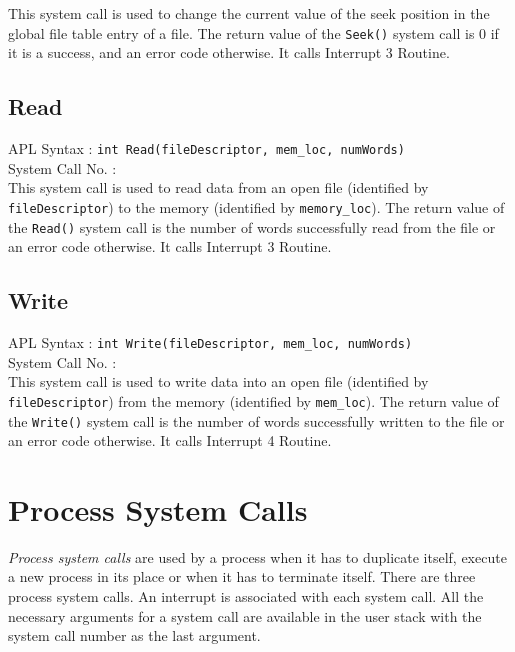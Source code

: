 \documentclass[10pt]{report}
\newcommand\counter[1]{\arabic{#1} \stepcounter{#1}}
\newcounter{syscall}
\begin{document}
This system call is used to change the current value of the seek position in the global file table entry of a file. The return value of the \texttt{Seek()} system call is 0 if it is a success, and an error code otherwise. It calls Interrupt 3 Routine. \\


\subsection{Read}
\label{sec:read()}

APL Syntax : \texttt{int Read(fileDescriptor, mem\_loc, numWords)}  \\
System Call No. : \counter{syscall} \\

This system call is used to read data from an open file (identified by \texttt{fileDescriptor}) to the memory (identified by \texttt{memory\_loc}). The return value of the \texttt{Read()} system call is the number of words successfully read from the file or an error code otherwise. It calls Interrupt 3 Routine. \\

\subsection{Write}
\label{sec:write()}

APL Syntax : \texttt{int Write(fileDescriptor, mem\_loc, numWords)}  \\
System Call No. : \counter{syscall} \\

This system call is used to write data into an open file (identified by \texttt{fileDescriptor}) from the memory (identified by \texttt{mem\_loc}). The return value of the \texttt{Write()} system call is 
the number of words successfully written to the file or an error code otherwise. It calls Interrupt 4 Routine. \\

	
\section{Process System Calls}
\label{sec:procsyscall}
\textit{Process system calls} are used by a process when it has to duplicate itself, execute a new process in its place or when it has to terminate itself. There are three process system calls. An interrupt is associated with each system call. All the necessary arguments for a system call are available in the user stack with the system call number as the last argument.\\
\end{document}
